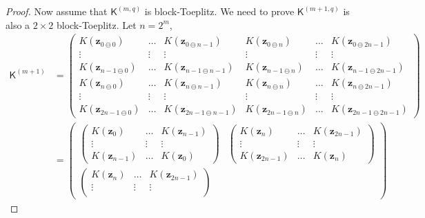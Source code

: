 \documentclass[graybox,footinfo]{svmult}
\newcommand{\bm}[1]{\boldsymbol{#1}}
\newcommand{\naturals}{\mathbb{N}}
\newcommand{\vz}{\bm{z}}
\newcommand{\mK}{\mathsf{K}}
\begin{document}
\begin{proof}
	Now assume that $\mK^{(m,q)}$ is block-Toeplitz.
	We need to prove $\mK^{(m+1, q)}$ is also a $2\times 2$ block-Toeplitz. Let $n=2^m$,
	\begin{align*}
	\mK^{(m+1)} &= 
	\begin{pmatrix}
	K(\vz_{0    \ominus 0}) & \hdots & K(\vz_{0    \ominus n-1}) & K(\vz_{0    \ominus n}) & \hdots & K(\vz_{0    \ominus 2n-1}) \\
	\vdots             & \vdots &             \vdots          &           \vdots      & \vdots &             \vdots         \\
	K(\vz_{n-1  \ominus 0}) & \hdots & K(\vz_{n-1  \ominus n-1}) & K(\vz_{n-1  \ominus n}) & \hdots & K(\vz_{n-1  \ominus 2n-1}) \\
	K(\vz_{n    \ominus 0}) & \hdots & K(\vz_{n    \ominus n-1}) & K(\vz_{n    \ominus n}) & \hdots & K(\vz_{n    \ominus 2n-1}) \\
	\vdots      & \vdots &             \vdots        &             \vdots      & \vdots &             \vdots         \\
	K(\vz_{2n-1 \ominus 0}) & \hdots & K(\vz_{2n-1 \ominus n-1}) & K(\vz_{2n-1 \ominus n}) & \hdots & K(\vz_{2n-1 \ominus 2n-1}) 
	\end{pmatrix} 
	\\
	& = 
	\begin{pmatrix}
	\begin{pmatrix}
	K(\vz_{  0   }) & \hdots & K(\vz_{ n-1}) \\
	\vdots          & \vdots &    \vdots     \\
	K(\vz_{ n-1  }) & \hdots & K(\vz_{ 0 })
	\end{pmatrix}
	& 
	\begin{pmatrix}
	K(\vz_{ n})     & \hdots & K(\vz_{ 2n-1}) \\
	\vdots          & \vdots &     \vdots     \\
	K(\vz_{ 2n-1 }) & \hdots & K(\vz_{ n })   
	\end{pmatrix}
	\\
	\begin{pmatrix}
	K(\vz_{ n})     & \hdots & K(\vz_{ 2n-1}) \\
	\vdots          & \vdots &     \vdots     \\

\end{pmatrix}
\end{pmatrix}
\end{align*}
\end{proof}
\end{document}
